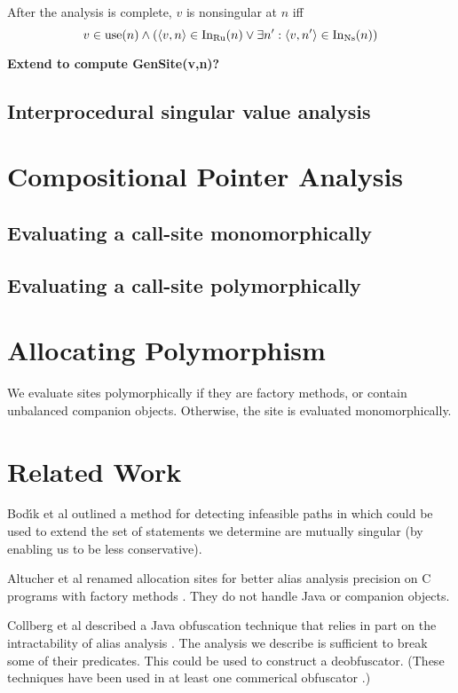 \documentclass[11pt,notitlepage]{article}
\begin{document}
After the analysis is complete, $v$ is nonsingular at $n$ iff
\begin{displaymath}
v\in\text{use}(n) \wedge \left(
\left\langle v,n \right\rangle \in \text{In}_\text{Ru}(n) \vee
\exists n': \left\langle v,n' \right\rangle\in\text{In}_\text{Ns}(n)
\right)
\end{displaymath}

\textbf{Extend to compute GenSite(v,n)?}

\subsection{Interprocedural singular value analysis}

\section{Compositional Pointer Analysis}

\subsection{Evaluating a call-site monomorphically}
\subsection{Evaluating a call-site polymorphically}

\section{Allocating Polymorphism}

We evaluate sites polymorphically if they are factory methods, or
contain unbalanced companion objects.  Otherwise, the site is
evaluated monomorphically.

\section{Related Work}

Bod{\'\i}k et al outlined a method for detecting infeasible paths
in \cite{267921} which could be used to extend the set of statements
we determine are mutually singular (by enabling us to be less conservative).

Altucher et al renamed allocation sites for better alias analysis
precision on C programs with factory methods \cite{199466}.  They
do not handle Java or companion objects.

Collberg et al described a Java obfuscation technique that relies in
part on the intractability of alias analysis \cite{268962}.  The
analysis we describe is sufficient to break some of their predicates.
This could be used to construct a deobfuscator.  (These techniques
have been used in at least one commerical obfuscator \cite{humper02}.)



\end{document}
